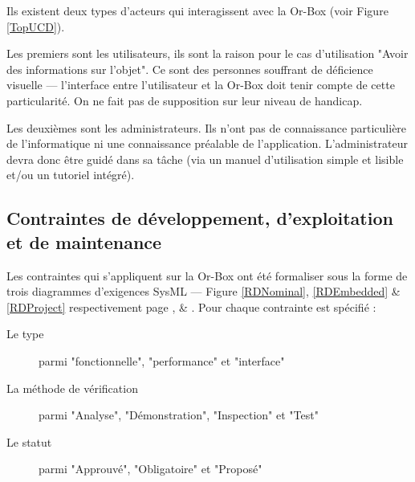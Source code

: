 Ils existent deux types d'acteurs qui interagissent avec la Or-Box (voir Figure \ref{TopUCD}).

Les premiers sont les utilisateurs, ils sont la raison pour le cas d'utilisation "Avoir des informations sur l'objet".
Ce sont des personnes souffrant de déficience visuelle --- l'interface entre l'utilisateur et la Or-Box doit tenir compte de cette particularité.
On ne fait pas de supposition sur leur niveau de handicap.

Les deuxièmes sont les administrateurs.
Ils n'ont pas de connaissance particulière de l'informatique ni une connaissance préalable de l'application.
L'administrateur devra donc être guidé dans sa tâche (via un manuel d'utilisation simple et lisible et/ou un tutoriel intégré).


\subsection{Contraintes de développement, d'exploitation et de maintenance}
\label{Contraintes}

Les contraintes qui s'appliquent sur la Or-Box ont été formaliser sous la forme de trois diagrammes d'exigences SysML --- Figure \ref{RDNominal}, \ref{RDEmbedded} \& \ref{RDProject} respectivement page \pageref{RDNominal}, \pageref{RDEmbedded} \& \pageref{RDProject}.
Pour chaque contrainte est spécifié :
\begin{description}
    \item[Le type] parmi "fonctionnelle", "performance" et "interface"
    \item[La méthode de vérification] parmi "Analyse", "Démonstration", "Inspection" et "Test"
    \item[Le statut] parmi "Approuvé", "Obligatoire" et "Proposé"
\end{description}

